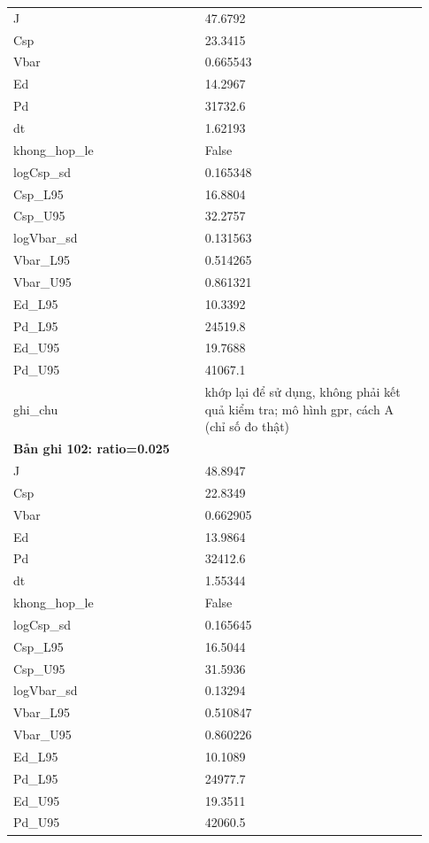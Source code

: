 \begin{longtable}{p{0.43\linewidth}p{0.50\linewidth}}
J & 47.6792 \\
Csp & 23.3415 \\
Vbar & 0.665543 \\
Ed & 14.2967 \\
Pd & 31732.6 \\
dt & 1.62193 \\
khong\_\allowbreak hop\_\allowbreak le & False \\
logCsp\_\allowbreak sd & 0.165348 \\
Csp\_\allowbreak L95 & 16.8804 \\
Csp\_\allowbreak U95 & 32.2757 \\
logVbar\_\allowbreak sd & 0.131563 \\
Vbar\_\allowbreak L95 & 0.514265 \\
Vbar\_\allowbreak U95 & 0.861321 \\
Ed\_\allowbreak L95 & 10.3392 \\
Pd\_\allowbreak L95 & 24519.8 \\
Ed\_\allowbreak U95 & 19.7688 \\
Pd\_\allowbreak U95 & 41067.1 \\
ghi\_\allowbreak chu & khớp lại để sử dụng, không phải kết quả kiểm tra; mô hình gpr, cách A (chỉ số đo thật) \\
\midrule
\multicolumn{2}{p{0.95\linewidth}}{\textbf{Bản ghi 102: ratio=0.025}} \\
J & 48.8947 \\
Csp & 22.8349 \\
Vbar & 0.662905 \\
Ed & 13.9864 \\
Pd & 32412.6 \\
dt & 1.55344 \\
khong\_\allowbreak hop\_\allowbreak le & False \\
logCsp\_\allowbreak sd & 0.165645 \\
Csp\_\allowbreak L95 & 16.5044 \\
Csp\_\allowbreak U95 & 31.5936 \\
logVbar\_\allowbreak sd & 0.13294 \\
Vbar\_\allowbreak L95 & 0.510847 \\
Vbar\_\allowbreak U95 & 0.860226 \\
Ed\_\allowbreak L95 & 10.1089 \\
Pd\_\allowbreak L95 & 24977.7 \\
Ed\_\allowbreak U95 & 19.3511 \\
Pd\_\allowbreak U95 & 42060.5 \\

\end{longtable}
